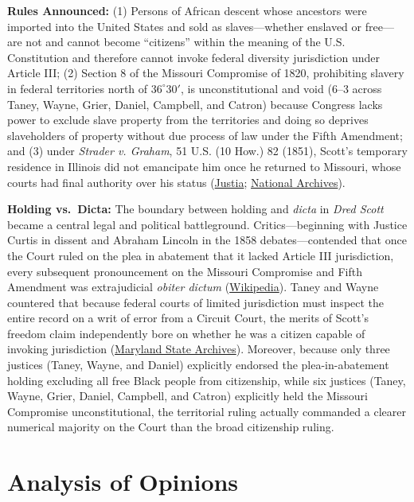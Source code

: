 \documentclass[12pt]{article}
\begin{document}
\textbf{Rules Announced:} (1) Persons of African descent whose ancestors were imported into the United States and sold as slaves---whether enslaved or free---are not and cannot become ``citizens'' within the meaning of the U.S. Constitution and therefore cannot invoke federal diversity jurisdiction under Article III; (2) Section 8 of the Missouri Compromise of 1820, prohibiting slavery in federal territories north of $36^{\circ}30'$, is unconstitutional and void (6--3 across Taney, Wayne, Grier, Daniel, Campbell, and Catron) because Congress lacks power to exclude slave property from the territories and doing so deprives slaveholders of property without due process of law under the Fifth Amendment; and (3) under \textit{Strader v. Graham}, 51 U.S. (10 How.) 82 (1851), Scott's temporary residence in Illinois did not emancipate him once he returned to Missouri, whose courts had final authority over his status (\href{https://supreme.justia.com/cases/federal/us/60/393/}{Justia}; \href{https://www.archives.gov/milestone-documents/dred-scott-v-sandford}{National Archives}).

\textbf{Holding vs.\ Dicta:} The boundary between holding and \textit{dicta} in \textit{Dred Scott} became a central legal and political battleground. Critics---beginning with Justice Curtis in dissent and Abraham Lincoln in the 1858 debates---contended that once the Court ruled on the plea in abatement that it lacked Article III jurisdiction, every subsequent pronouncement on the Missouri Compromise and Fifth Amendment was extrajudicial \textit{obiter dictum} (\href{https://en.wikipedia.org/wiki/Dred_Scott_v._Sandford}{Wikipedia}). Taney and Wayne countered that because federal courts of limited jurisdiction must inspect the entire record on a writ of error from a Circuit Court, the merits of Scott's freedom claim independently bore on whether he was a citizen capable of invoking jurisdiction (\href{https://msa.maryland.gov/megafile/msa/speccol/sc5300/sc5339/000091/000000/000004/restricted/dred_scott/decision/wayne.html}{Maryland State Archives}). Moreover, because only three justices (Taney, Wayne, and Daniel) explicitly endorsed the plea-in-abatement holding excluding all free Black people from citizenship, while six justices (Taney, Wayne, Grier, Daniel, Campbell, and Catron) explicitly held the Missouri Compromise unconstitutional, the territorial ruling actually commanded a clearer numerical majority on the Court than the broad citizenship ruling.

\section{Analysis of Opinions}
\end{document}
